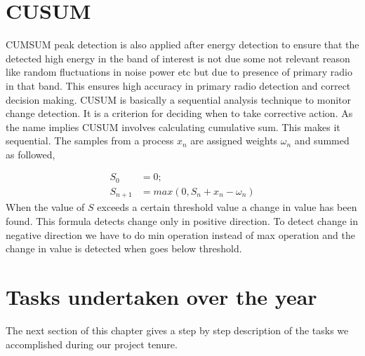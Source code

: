 \section{CUSUM}
CUMSUM peak detection is also applied after energy detection to ensure that the
detected high energy in the band of interest is not due some  not relevant 
reason like random fluctuations in noise power etc but due to presence of 
primary radio in that band. This ensures high accuracy in primary radio 
detection and correct decision making.
CUSUM is basically a sequential analysis technique to monitor change detection. 
It is a criterion for deciding when to take corrective action. As the name 
implies CUSUM involves calculating cumulative sum. This makes it sequential. 
The samples from a process $x_n$  are assigned weights $\omega_n$  and summed 
as followed,

\begin{align}
S_0 &= 0; \nonumber \\
S_{n+1} &= max(0, S_n + x_n - \omega_n) \nonumber
\end{align}
When the value of $S$ exceeds a certain threshold value a change in value has 
been found. This formula detects change only in positive direction. To detect 
change in negative direction we have to do min operation instead of max 
operation and the change in value is detected when goes below threshold.







\section{Tasks undertaken over the year}
The next section of this chapter gives a step by step description of the tasks we 
accomplished during our project tenure. 


